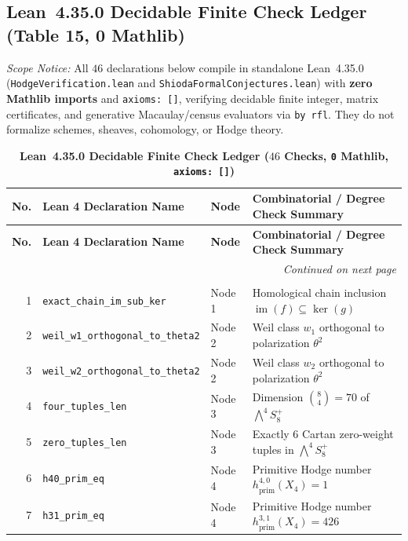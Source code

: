 \documentclass[11pt,a4paper]{article}
\renewcommand{\arraystretch}{1.2}
\theoremstyle{definition}
\theoremstyle{remark}
\begin{document}
\subsection{Lean~4.35.0 Decidable Finite Check Ledger (Table 15, 0 Mathlib)}
\noindent\textit{Scope Notice:} All $46$ declarations below compile in standalone Lean~4.35.0 (\texttt{HodgeVerification.lean} and \texttt{ShiodaFormalConjectures.lean}) with \textbf{zero Mathlib imports} and \texttt{axioms: []}, verifying decidable finite integer, matrix certificates, and generative Macaulay/census evaluators via \texttt{by rfl}. They do not formalize schemes, sheaves, cohomology, or Hodge theory.
{\small
\renewcommand{\arraystretch}{1.06}
\begin{longtable}{r >{\ttfamily\scriptsize}p{6.4cm} l p{6.8cm}}
\caption{\textbf{Lean~4.35.0 Decidable Finite Check Ledger ($46$ Checks, \texttt{0} Mathlib, \texttt{axioms: []})}} \label{tab:lean_ledger} \\
\toprule
\textbf{No.} & \textbf{Lean 4 Declaration Name} & \textbf{Node} & \textbf{Combinatorial / Degree Check Summary} \\
\midrule
\endfirsthead
\toprule
\textbf{No.} & \textbf{Lean 4 Declaration Name} & \textbf{Node} & \textbf{Combinatorial / Degree Check Summary} \\
\midrule
\endhead
\midrule
\multicolumn{4}{r}{\textit{Continued on next page}} \\
\bottomrule
\endfoot
\bottomrule
\endlastfoot
\multicolumn{4}{c}{\textbf{Standalone Core Lean~4 Decidable Finite Checks (43 Checks, 0 Mathlib)}} \\
\midrule
1 & \texttt{exact\_chain\_im\_sub\_ker} & Node 1 & Homological chain inclusion $\operatorname{im}(f) \subseteq \ker(g)$ \\
2 & \texttt{weil\_w1\_orthogonal\_to\_theta2} & Node 2 & Weil class $w_1$ orthogonal to polarization $\theta^2$ \\
3 & \texttt{weil\_w2\_orthogonal\_to\_theta2} & Node 2 & Weil class $w_2$ orthogonal to polarization $\theta^2$ \\
4 & \texttt{four\_tuples\_len} & Node 3 & Dimension $\binom{8}{4} = 70$ of $\bigwedge^4 S^+_8$ \\
5 & \texttt{zero\_tuples\_len} & Node 3 & Exactly 6 Cartan zero-weight tuples in $\bigwedge^4 S^+_8$ \\
6 & \texttt{h40\_prim\_eq} & Node 4 & Primitive Hodge number $h^{4,0}_{\mathrm{prim}}(X_4) = 1$ \\
7 & \texttt{h31\_prim\_eq} & Node 4 & Primitive Hodge number $h^{3,1}_{\mathrm{prim}}(X_4) = 426$ \\

\end{longtable}}
\end{document}
